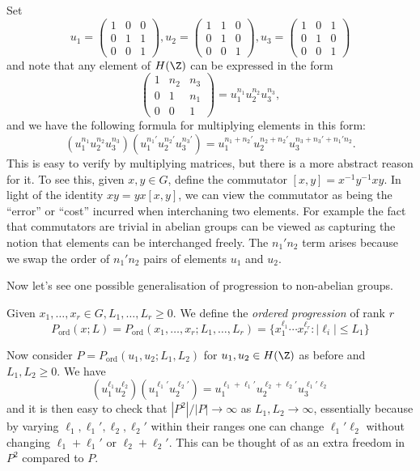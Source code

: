 \documentclass[a4paper]{article}
\begin{document}
Set
\[
  u_1 =
  \begin{pmatrix}
    1 & 0 & 0 \\
    0 & 1 & 1 \\
    0 & 0 & 1
  \end{pmatrix}
  ,u_2 =
  \begin{pmatrix}
    1 & 1 & 0 \\
    0 & 1 & 0 \\
    0 & 0 & 1
  \end{pmatrix}
  ,u_3 =
  \begin{pmatrix}
    1 & 0 & 1 \\
    0 & 1 & 0 \\
    0 & 0 & 1
  \end{pmatrix}
\]
and note that any element of \(H(\Z)\) can be expressed in the form
\[
  \begin{pmatrix}
    1 & n_2 & n_3 \\
    0 & 1 & n_1 \\
    0 & 0 & 1
  \end{pmatrix}
  = u_1^{n_1} u_2^{n_2} u_3^{n_3},
\]
and we have the following formula for multiplying elements in this form:
\[
  (u_1^{n_1}u_2^{n_2}u_3^{n_3}) (u_1^{n_1'}u_2^{n_2'}u_3^{n_3'}) = u_1^{n_1 + n_2'} u_2^{n_2 + n_2'} u_3^{n_3 + n_3' + n_1'n_2}.
  \tag{7.1}
\]
This is easy to verify by multiplying matrices, but there is a more abstract reason for it. To see this, given \(x, y \in G\), define the commutator \([x, y] = x^{-1}y^{-1}xy\). In light of the identity \(xy = yx [x, y]\), we can view the commutator as being the ``error'' or ``cost'' incurred when interchaning two elements. For example the fact that commutators are trivial in abelian groups can be viewed as capturing the notion that elements can be interchanged freely. The \(n_1'n_2\) term arises because we swap the order of \(n_1'n_2\) pairs of elements \(u_1\) and \(u_2\).

Now let's see one possible generalisation of progression to non-abelian groups.

\begin{definition}
  Given \(x_1, \dots, x_r \in G, L_1, \dots, L_r \geq 0\). We define the \emph{ordered progression} of rank \(r\)
  \[
    P_{\text{ord}}(x; L)
    = P_{\text{ord}}(x_1, \dots, x_r; L_1, \dots, L_r)
    = \{x_1^{\ell_1} \cdots x_r^{\ell_r}: |\ell_i| \leq L_1\}
  \]
\end{definition}

Now consider \(P = P_{\text{ord}}(u_1, u_2; L_1, L_2)\) for \(u_1, u_2 \in H(\Z)\) as before and \(L_1, L_2 \geq 0\). We have
\[
  (u_1^{\ell_1} u_2^{\ell_2}) (u_1^{\ell_1'} u_2^{\ell_2'}) = u_1^{\ell_1 + \ell_1'} u_2^{\ell_2 + \ell_2'} u_3^{\ell_1'\ell_2}
\]
and it is then easy to check that \(|P^2|/|P| \to \infty\) as \(L_1, L_2 \to \infty\), essentially because by varying \(\ell_1, \ell_1', \ell_2, \ell_2'\) within their ranges one can change \(\ell_1'\ell_2\) without changing \(\ell_1 + \ell_1'\) or \(\ell_2 + \ell_2'\). This can be thought of as an extra freedom in \(P^2\) compared to \(P\).
\end{document}

